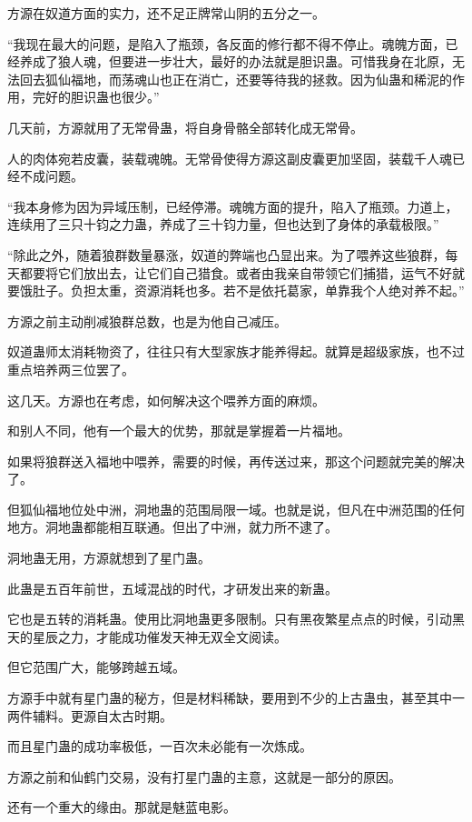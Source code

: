 \begin{this_body}
方源在奴道方面的实力，还不足正牌常山阴的五分之一。

“我现在最大的问题，是陷入了瓶颈，各反面的修行都不得不停止。魂魄方面，已经养成了狼人魂，但要进一步壮大，最好的办法就是胆识蛊。可惜我身在北原，无法回去狐仙福地，而荡魂山也正在消亡，还要等待我的拯救。因为仙蛊和稀泥的作用，完好的胆识蛊也很少。”

几天前，方源就用了无常骨蛊，将自身骨骼全部转化成无常骨。

人的肉体宛若皮囊，装载魂魄。无常骨使得方源这副皮囊更加坚固，装载千人魂已经不成问题。

“我本身修为因为异域压制，已经停滞。魂魄方面的提升，陷入了瓶颈。力道上，连续用了三只十钧之力蛊，养成了三十钧力量，但也达到了身体的承载极限。”

“除此之外，随着狼群数量暴涨，奴道的弊端也凸显出来。为了喂养这些狼群，每天都要将它们放出去，让它们自己猎食。或者由我亲自带领它们捕猎，运气不好就要饿肚子。负担太重，资源消耗也多。若不是依托葛家，单靠我个人绝对养不起。”

方源之前主动削减狼群总数，也是为他自己减压。

奴道蛊师太消耗物资了，往往只有大型家族才能养得起。就算是超级家族，也不过重点培养两三位罢了。

这几天。方源也在考虑，如何解决这个喂养方面的麻烦。

和别人不同，他有一个最大的优势，那就是掌握着一片福地。

如果将狼群送入福地中喂养，需要的时候，再传送过来，那这个问题就完美的解决了。

但狐仙福地位处中洲，洞地蛊的范围局限一域。也就是说，但凡在中洲范围的任何地方。洞地蛊都能相互联通。但出了中洲，就力所不逮了。

洞地蛊无用，方源就想到了星门蛊。

此蛊是五百年前世，五域混战的时代，才研发出来的新蛊。

它也是五转的消耗蛊。使用比洞地蛊更多限制。只有黑夜繁星点点的时候，引动黑天的星辰之力，才能成功催发天神无双全文阅读。

但它范围广大，能够跨越五域。

方源手中就有星门蛊的秘方，但是材料稀缺，要用到不少的上古蛊虫，甚至其中一两件辅料。更源自太古时期。

而且星门蛊的成功率极低，一百次未必能有一次炼成。

方源之前和仙鹤门交易，没有打星门蛊的主意，这就是一部分的原因。

还有一个重大的缘由。那就是魅蓝电影。


\end{this_body}
